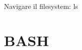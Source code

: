 \documentclass{beamer}
\begin{document}
    \begin{frame}{Navigare il filesystem: ls}
    \end{frame}

    \section{BASH}
    
\end{document}
